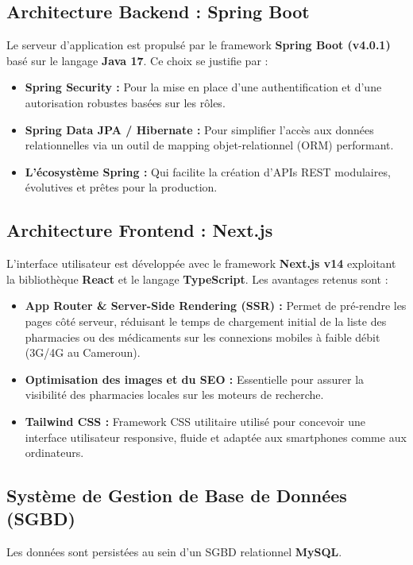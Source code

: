 \documentclass[12pt,a4paper]{report}
\begin{document}
	\subsection{Architecture Backend : Spring Boot}
	Le serveur d'application est propulsé par le framework \textbf{Spring Boot (v4.0.1)} basé sur le langage \textbf{Java 17}. Ce choix se justifie par :
	\begin{itemize}
		\item \textbf{Spring Security :} Pour la mise en place d'une authentification et d'une autorisation robustes basées sur les rôles.
		\item \textbf{Spring Data JPA / Hibernate :} Pour simplifier l'accès aux données relationnelles via un outil de mapping objet-relationnel (ORM) performant.
		\item \textbf{L'écosystème Spring :} Qui facilite la création d'APIs REST modulaires, évolutives et prêtes pour la production.
	\end{itemize}
	
	\subsection{Architecture Frontend : Next.js}
	L'interface utilisateur est développée avec le framework \textbf{Next.js v14} exploitant la bibliothèque \textbf{React} et le langage \textbf{TypeScript}. Les avantages retenus sont :
	\begin{itemize}
		\item \textbf{App Router \& Server-Side Rendering (SSR) :} Permet de pré-rendre les pages côté serveur, réduisant le temps de chargement initial de la liste des pharmacies ou des médicaments sur les connexions mobiles à faible débit (3G/4G au Cameroun).
		\item \textbf{Optimisation des images et du SEO :} Essentielle pour assurer la visibilité des pharmacies locales sur les moteurs de recherche.
		\item \textbf{Tailwind CSS :} Framework CSS utilitaire utilisé pour concevoir une interface utilisateur responsive, fluide et adaptée aux smartphones comme aux ordinateurs.
	\end{itemize}
	
	\subsection{Système de Gestion de Base de Données (SGBD)}
	Les données sont persistées au sein d'un SGBD relationnel \textbf{ MySQL}.
	
\end{document}
